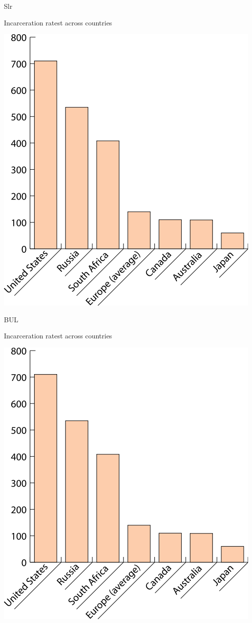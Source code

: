 \documentclass[print,Draft]{faosyb}
\begin{document}
\begin{chart}{S}{lr}
\caption{Incarceration ratest across countries}
\label{chart:incarceration}
\includegraphics[width=\chartwidth,height=\chartheight]{incarceration}  
\end{chart}

\begin{chart}{B}{UL}
\caption{Incarceration ratest across countries}
\label{chart:incarceration}
\includegraphics[width=\chartwidth,height=\chartheight]{incarceration}  
\end{chart}
\end{document}
